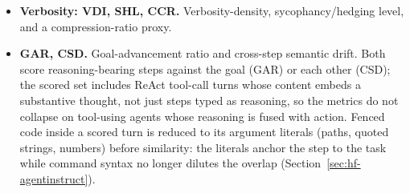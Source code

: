 \documentclass[11pt]{article}
\begin{document}
\begin{itemize}[leftmargin=*]
        against accumulated historical sequences; with no history it falls back
        to a single-trace proxy whose retry and thrash signals key on the
        \emph{invocation} (tool $+$ parameters), not the bare tool name, so
        single-tool command agents are not structurally penalised
        (Section~\ref{sec:hf-agentinstruct}).
  \item \textbf{Verbosity: VDI, SHL, CCR.} Verbosity-density, sycophancy/hedging
        level, and a compression-ratio proxy.
  \item \textbf{GAR, CSD.} Goal-advancement ratio and cross-step semantic drift.
        Both score reasoning-bearing steps against the goal (GAR) or each other
        (CSD); the scored set includes ReAct tool-call turns whose content embeds
        a substantive thought, not just steps typed as reasoning, so the metrics
        do not collapse on tool-using agents whose reasoning is fused with action.
        Fenced code inside a scored turn is reduced to its argument literals
        (paths, quoted strings, numbers) before similarity: the literals anchor
        the step to the task while command syntax no longer dilutes the overlap
        (Section~\ref{sec:hf-agentinstruct}).
\end{itemize}
\end{document}

